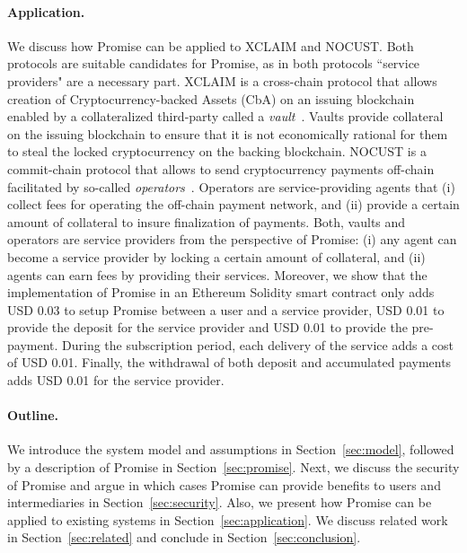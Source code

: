 \documentclass[runningheads]{llncs}
\newcommand{\sys}{Promise\xspace}
\begin{document}
\paragraph{Application.}
We discuss how \sys can be applied to XCLAIM and NOCUST.
Both protocols are suitable candidates for \sys, as in both protocols ``service providers" are a necessary part.
XCLAIM is a cross-chain protocol that allows creation of Cryptocurrency-backed Assets (CbA) on an issuing blockchain enabled by a collateralized third-party called a \emph{vault}~\cite{Zamyatin2019XCLAIM}.
Vaults provide collateral on the issuing blockchain to ensure that it is not economically rational for them to steal the locked cryptocurrency on the backing blockchain.
NOCUST is a commit-chain protocol that allows to send cryptocurrency payments off-chain facilitated by so-called \emph{operators}~\cite{Khalil2019NOCUST}.
Operators are service-providing agents that (i) collect fees for operating the off-chain payment network, and (ii) provide a certain amount of collateral to insure finalization of payments.
Both, vaults and operators are service providers from the perspective of \sys: (i) any agent can become a service provider by locking a certain amount of collateral, and (ii) agents can earn fees by providing their services. 
Moreover, we show that the implementation of \sys in an Ethereum Solidity smart contract only adds USD 0.03 to setup Promise between a user and a service provider, USD 0.01 to provide the deposit for the service provider and USD 0.01 to provide the pre-payment.
During the subscription period, each delivery of the service adds a cost of USD 0.01.
Finally, the withdrawal of both deposit and accumulated payments adds USD 0.01 for the service provider.


\paragraph{Outline.}
We introduce the system model and assumptions in Section~\ref{sec:model}, followed by a description of \sys in Section~\ref{sec:promise}.
Next, we discuss the security of \sys and argue in which cases \sys can provide benefits to users and intermediaries in Section~\ref{sec:security}.
Also, we present how \sys can be applied to existing systems in Section~\ref{sec:application}.
We discuss related work in Section~\ref{sec:related} and conclude in Section~\ref{sec:conclusion}.
\end{document}
